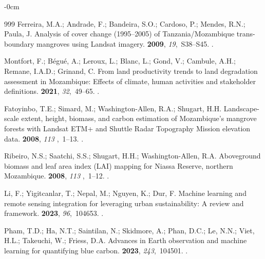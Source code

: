 \documentclass[coasts,article,accept,pdftex,oneauthor]{Definitions/mdpi}
\begin{document}
\begin{adjustwidth}{-\extralength}{0cm}
\begin{thebibliography}{999}
Ferreira, M.A.; Andrade, F.; Bandeira, S.O.; Cardoso, P.; Mendes, R.N.; Paula,
  J.
\newblock Analysis of cover change (1995–2005) of Tanzania/Mozambique
  trans-boundary mangroves using Landsat imagery.
 {\bf
  2009}, {\em 19},~S38--S45.
.

Montfort, F.; Bégué, A.; Leroux, L.; Blanc, L.; Gond, V.; Cambule, A.H.;
  Remane, I.A.D.; Grinand, C.
\newblock From land productivity trends to land degradation assessment in
  Mozambique: Effects of climate, human activities and stakeholder definitions.
 {\bf 2021}, {\em 32},~49--65.
.

Fatoyinbo, T.E.; Simard, M.; Washington-Allen, R.A.; Shugart, H.H.
\newblock Landscape-scale extent, height, biomass, and carbon estimation of
  Mozambique's mangrove forests with Landsat ETM+ and Shuttle Radar Topography
  Mission elevation data.
 {\bf 2008},
  {\em 113%
},~1--13.
.

Ribeiro, N.S.; Saatchi, S.S.; Shugart, H.H.; Washington-Allen, R.A.
\newblock Aboveground biomass and leaf area index (LAI) mapping for Niassa
  Reserve, northern Mozambique.
 {\bf 2008},
 {\em 113%
},~1--12.
.

Li, F.; Yigitcanlar, T.; Nepal, M.; Nguyen, K.; Dur, F.
\newblock Machine learning and remote sensing integration for leveraging urban
  sustainability: A review and framework.
 {\bf 2023}, {\em 96},~104653.
.

Pham, T.D.; Ha, N.T.; Saintilan, N.; Skidmore, A.; Phan, D.C.; Le, N.N.; Viet,
  H.L.; Takeuchi, W.; Friess, D.A.
\newblock Advances in Earth observation and machine learning for quantifying
  blue carbon.
 {\bf 2023}, {\em 243},~104501.
.


\end{thebibliography}
\end{adjustwidth}
\end{document}
